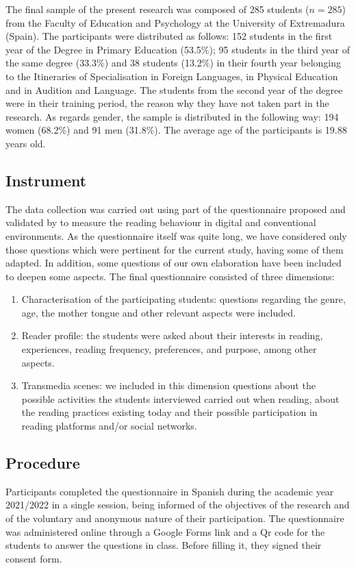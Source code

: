\documentclass[english]{textolivre}
\begin{document}
The final sample of the present research was composed of 285 students ($n=285$) from the Faculty of Education and Psychology at the University of Extremadura (Spain). The participants were distributed as follows: 152 students in the first year of the Degree in Primary Education (53.5\%); 95 students in the third year of the same degree (33.3\%) and 38 students (13.2\%) in their fourth year belonging to the Itineraries of Specialisation in Foreign Languages, in Physical Education and in Audition and Language. The students from the second year of the degree were in their training period, the reason why they have not taken part in the research. As regards gender, the sample is distributed in the following way: 194 women (68.2\%) and 91 men (31.8\%). The average age of the participants is 19.88 years old.


\subsection{Instrument}
The data collection was carried out using part of the questionnaire proposed and validated by \textcite{igarza_metodologicomun_2014} to measure the reading behaviour in digital and conventional environments. As the questionnaire itself was quite long, we have considered only those questions which were pertinent for the current study, having some of them adapted. In addition, some questions of our own elaboration have been included to deepen some aspects. The final questionnaire consisted of three dimensions: 

 \begin{enumerate}
     \item Characterisation of the participating students: questions regarding the genre, age, the mother tongue and other relevant aspects were included.
     \item Reader profile: the students were asked about their interests in reading, experiences, reading frequency, preferences, and purpose, among other aspects.
     \item Transmedia scenes: we included in this dimension questions about the possible activities the students interviewed carried out when reading, about the reading practices existing today and their possible participation in reading platforms and/or social networks.
 \end{enumerate}
   


\subsection{Procedure}
Participants completed the questionnaire in Spanish during the academic year 2021/2022 in a single session, being informed of the objectives of the research and of the voluntary and anonymous nature of their participation. The questionnaire was administered online through a Google Forms link and a Qr code for the students to answer the questions in class. Before filling it, they signed their consent form.
\end{document}
